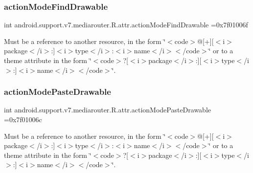\subsubsection{\texorpdfstring{action\+Mode\+Find\+Drawable}{actionModeFindDrawable}}
{\footnotesize\ttfamily int android.\+support.\+v7.\+mediarouter.\+R.\+attr.\+action\+Mode\+Find\+Drawable =0x7f01006f\hspace{0.3cm}{\ttfamily [static]}}

Must be a reference to another resource, in the form \char`\"{}$<$code$>$@\mbox{[}+\mbox{]}\mbox{[}$<$i$>$package$<$/i$>$\+:\mbox{]}$<$i$>$type$<$/i$>$\+:$<$i$>$name$<$/i$>$$<$/code$>$\char`\"{} or to a theme attribute in the form \char`\"{}$<$code$>$?\mbox{[}$<$i$>$package$<$/i$>$\+:\mbox{]}\mbox{[}$<$i$>$type$<$/i$>$\+:\mbox{]}$<$i$>$name$<$/i$>$$<$/code$>$\char`\"{}. \mbox{\label{classandroid_1_1support_1_1v7_1_1mediarouter_1_1R_1_1attr_ae3e83e89932fabdb6d38e932119b85c8}} 
\subsubsection{\texorpdfstring{action\+Mode\+Paste\+Drawable}{actionModePasteDrawable}}
{\footnotesize\ttfamily int android.\+support.\+v7.\+mediarouter.\+R.\+attr.\+action\+Mode\+Paste\+Drawable =0x7f01006c\hspace{0.3cm}{\ttfamily [static]}}

Must be a reference to another resource, in the form \char`\"{}$<$code$>$@\mbox{[}+\mbox{]}\mbox{[}$<$i$>$package$<$/i$>$\+:\mbox{]}$<$i$>$type$<$/i$>$\+:$<$i$>$name$<$/i$>$$<$/code$>$\char`\"{} or to a theme attribute in the form \char`\"{}$<$code$>$?\mbox{[}$<$i$>$package$<$/i$>$\+:\mbox{]}\mbox{[}$<$i$>$type$<$/i$>$\+:\mbox{]}$<$i$>$name$<$/i$>$$<$/code$>$\char`\"{}. \mbox{\label{classandroid_1_1support_1_1v7_1_1mediarouter_1_1R_1_1attr_a5a19706a14edef61062706ec17d5d024}} 
